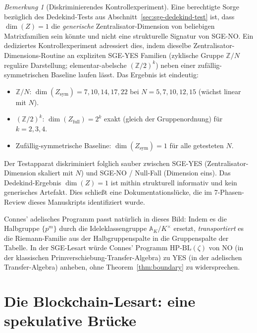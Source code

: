 \documentclass[11pt]{article}
\theoremstyle{definition}
\theoremstyle{remark}
\newtheorem{remark}[theorem]{Bemerkung}
\newcommand{\HBL}{\mathrm{HP\text{-}BL}}
\begin{document}
\begin{remark}[Diskriminierendes Kontrollexperiment]
\label{rem:sge-control}
Eine berechtigte Sorge bezüglich des Dedekind-Tests aus
Abschnitt~\ref{sec:sge-dedekind-test} ist, dass $\dim(Z) = 1$ die
\emph{generische} Zentralisator-Dimension von beliebigen Matrixfamilien sein
könnte und nicht eine strukturelle Signatur von SGE-NO. Ein dediziertes
Kontrollexperiment \cite{SGEControlExperiment2026} adressiert dies,
indem dieselbe Zentralisator-Dimensions-Routine an expliziten SGE-YES
Familien (zyklische Gruppe $\mathbb{Z}/N$ reguläre Darstellung;
elementar-abelsche $(\mathbb{Z}/2)^k$) neben
einer zufällig-symmetrischen Baseline laufen lässt. Das Ergebnis ist eindeutig:
\begin{itemize}
\item $\mathbb{Z}/N$: $\dim(Z_{\text{sym}}) = 7, 10, 14, 17, 22$
  bei $N = 5, 7, 10, 12, 15$ (wächst linear mit $N$).
\item $(\mathbb{Z}/2)^k$: $\dim(Z_{\text{full}}) = 2^k$ exakt
  (gleich der Gruppenordnung) für $k = 2, 3, 4$.
\item Zufällig-symmetrische Baseline: $\dim(Z_{\text{sym}}) = 1$ für
  alle getesteten $N$.
\end{itemize}
Der Testapparat diskriminiert folglich sauber zwischen SGE-YES
(Zentralisator-Dimension skaliert mit $N$) und SGE-NO / Null-Fall
(Dimension eins). Das Dedekind-Ergebnis $\dim(Z) = 1$ ist mithin
strukturell informativ und kein generisches Artefakt. Dies schließt eine
Dokumentationslücke, die im 7-Phasen-Review \cite{RHCritiqueReview2026}
dieses Manuskripts identifiziert wurde.
\end{remark}

Connes' adelisches Programm \cite{Connes1999, Connes2026} passt
natürlich in dieses Bild: Indem es die Halbgruppe $\{p^m\}$ durch die
Ideleklassengruppe $\mathbb{A}_K/K^\times$ ersetzt, \emph{transportiert} es die
Riemann-Familie aus der Halbgruppenspalte in die Gruppenspalte der
Tabelle. In der SGE-Lesart würde Connes' Programm
$\HBL(\zeta)$ von NO (in der klassischen Primverschiebung-Transfer-Algebra)
zu YES (in der adelischen Transfer-Algebra) anheben, ohne
Theorem~\ref{thm:boundary} zu widersprechen.

\section{Die Blockchain-Lesart: eine spekulative Brücke}
\label{sec:blockchain}
\end{document}
